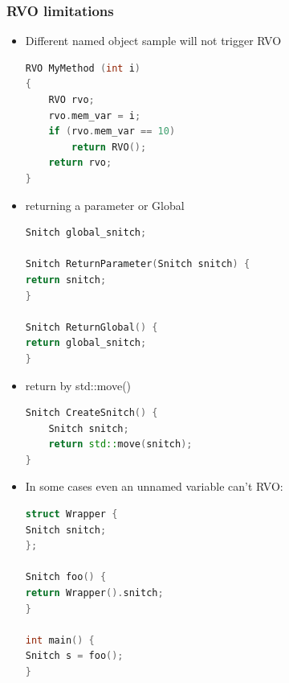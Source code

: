 \documentclass[a4paper,12pt,twoside]{book}
\begin{document}
\subsubsection{RVO limitations}
\begin{itemize}
	\item Different named object sample will not trigger RVO
	\begin{lstlisting}[frame=single, language=c++, mathescape=true]
RVO MyMethod (int i)
{
	RVO rvo;
	rvo.mem_var = i;
	if (rvo.mem_var == 10)
		return RVO();
	return rvo; 
}
	\end{lstlisting}
	
	\item returning a parameter or Global
\begin{lstlisting}[frame=single, language=c++, mathescape=true]
Snitch global_snitch;

Snitch ReturnParameter(Snitch snitch) {
return snitch;
}

Snitch ReturnGlobal() {
return global_snitch;
}
\end{lstlisting}

\item return by std::move()
\begin{lstlisting}[frame=single, language=c++, mathescape=true]
Snitch CreateSnitch() {
	Snitch snitch;
	return std::move(snitch);
}
\end{lstlisting}
	
\item In some cases even an unnamed variable can't RVO:
\begin{lstlisting}[frame=single, language=c++, mathescape=true]
struct Wrapper {
Snitch snitch;
};

Snitch foo() {
return Wrapper().snitch;
}

int main() {
Snitch s = foo();
}
\end{lstlisting}

\end{itemize}
\end{document}

